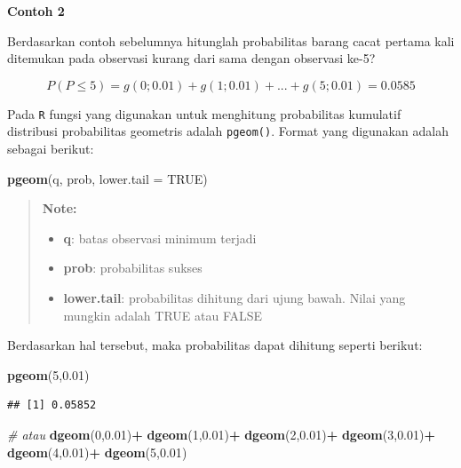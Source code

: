 \documentclass[]{book}
\newenvironment{Shaded}{\begin{snugshade}}{\end{snugshade}}
\newcommand{\KeywordTok}[1]{\textcolor[rgb]{0.13,0.29,0.53}{\textbf{#1}}}
\newcommand{\DataTypeTok}[1]{\textcolor[rgb]{0.13,0.29,0.53}{#1}}
\newcommand{\DecValTok}[1]{\textcolor[rgb]{0.00,0.00,0.81}{#1}}
\newcommand{\FloatTok}[1]{\textcolor[rgb]{0.00,0.00,0.81}{#1}}
\newcommand{\StringTok}[1]{\textcolor[rgb]{0.31,0.60,0.02}{#1}}
\newcommand{\CommentTok}[1]{\textcolor[rgb]{0.56,0.35,0.01}{\textit{#1}}}
\newcommand{\OtherTok}[1]{\textcolor[rgb]{0.56,0.35,0.01}{#1}}
\newcommand{\OperatorTok}[1]{\textcolor[rgb]{0.81,0.36,0.00}{\textbf{#1}}}
\newcommand{\NormalTok}[1]{#1}
\providecommand{\tightlist}{%
  \setlength{\itemsep}{0pt}\setlength{\parskip}{0pt}}
\begin{document}
\textbf{Contoh 2}

Berdasarkan contoh sebelumnya hitunglah probabilitas barang cacat
pertama kali ditemukan pada observasi kurang dari sama dengan observasi
ke-5?

\[
P\left(P\le5\right)=g\left(0;0.01\right)+g\left(1;0.01\right)+...+g\left(5;0.01\right)=0.0585
\]

Pada \texttt{R} fungsi yang digunakan untuk menghitung probabilitas
kumulatif distribusi probabilitas geometris adalah \texttt{pgeom()}.
Format yang digunakan adalah sebagai berikut:

\begin{Shaded}
\begin{Highlighting}[]
\KeywordTok{pgeom}\NormalTok{(q, prob, }\DataTypeTok{lower.tail =} \OtherTok{TRUE}\NormalTok{)}
\end{Highlighting}
\end{Shaded}

\begin{quote}
\textbf{Note: }

\begin{itemize}
\tightlist
\item
  \textbf{q}: batas observasi minimum terjadi
\item
  \textbf{prob}: probabilitas sukses
\item
  \textbf{lower.tail}: probabilitas dihitung dari ujung bawah. Nilai
  yang mungkin adalah TRUE atau FALSE
\end{itemize}
\end{quote}

Berdasarkan hal tersebut, maka probabilitas dapat dihitung seperti
berikut:

\begin{Shaded}
\begin{Highlighting}[]
\KeywordTok{pgeom}\NormalTok{(}\DecValTok{5}\NormalTok{,}\FloatTok{0.01}\NormalTok{)}
\end{Highlighting}
\end{Shaded}

\begin{verbatim}
## [1] 0.05852
\end{verbatim}

\begin{Shaded}
\begin{Highlighting}[]
\CommentTok{# atau}
\KeywordTok{dgeom}\NormalTok{(}\DecValTok{0}\NormalTok{,}\FloatTok{0.01}\NormalTok{)}\OperatorTok{+}
\StringTok{  }\KeywordTok{dgeom}\NormalTok{(}\DecValTok{1}\NormalTok{,}\FloatTok{0.01}\NormalTok{)}\OperatorTok{+}
\StringTok{  }\KeywordTok{dgeom}\NormalTok{(}\DecValTok{2}\NormalTok{,}\FloatTok{0.01}\NormalTok{)}\OperatorTok{+}
\StringTok{  }\KeywordTok{dgeom}\NormalTok{(}\DecValTok{3}\NormalTok{,}\FloatTok{0.01}\NormalTok{)}\OperatorTok{+}
\StringTok{  }\KeywordTok{dgeom}\NormalTok{(}\DecValTok{4}\NormalTok{,}\FloatTok{0.01}\NormalTok{)}\OperatorTok{+}
\StringTok{  }\KeywordTok{dgeom}\NormalTok{(}\DecValTok{5}\NormalTok{,}\FloatTok{0.01}\NormalTok{)}
\end{Highlighting}
\end{Shaded}
\end{document}
